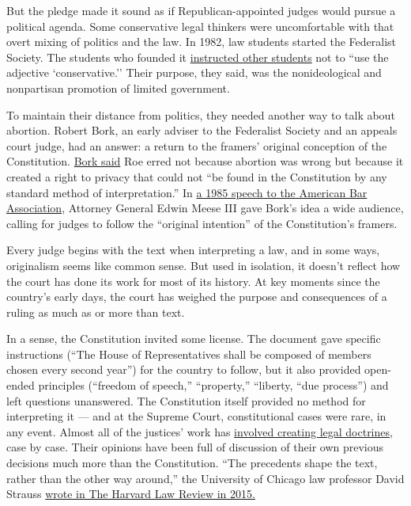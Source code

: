 But the pledge made it sound as if Republican-appointed judges would
pursue a political agenda. Some conservative legal thinkers were
uncomfortable with that overt mixing of politics and the law. In 1982,
law students started the Federalist Society. The students who founded it
\href{https://www.lawliberty.org/liberty-forum/is-legal-conservatism-as-accomplished-as-it-thinks-it-is/}{instructed
other students} not to ``use the adjective `conservative.'' Their
purpose, they said, was the nonideological and nonpartisan promotion of
limited government.

To maintain their distance from politics, they needed another way to
talk about abortion. Robert Bork, an early adviser to the Federalist
Society and an appeals court judge, had an answer: a return to the
framers' original conception of the Constitution.
\href{https://www.nytimes3xbfgragh.onion/1987/09/13/us/robert-bork-s-views-on-a-wide-range-of-legal-issues-in-his-own-words.html}{Bork
said} Roe erred not because abortion was wrong but because it created a
right to privacy that could not ``be found in the Constitution by any
standard method of interpretation.'' In
\href{https://www.nytimes3xbfgragh.onion/1985/07/10/us/meese-in-bar-groug-speech-criticizes-high-court.html}{a
1985 speech to the American Bar Association}, Attorney General Edwin
Meese III gave Bork's idea a wide audience, calling for judges to follow
the ``original intention'' of the Constitution's framers.

Every judge begins with the text when interpreting a law, and in some
ways, originalism seems like common sense. But used in isolation, it
doesn't reflect how the court has done its work for most of its history.
At key moments since the country's early days, the court has weighed the
purpose and consequences of a ruling as much as or more than text.

In a sense, the Constitution invited some license. The document gave
specific instructions (``The House of Representatives shall be composed
of members chosen every second year'') for the country to follow, but it
also provided open-ended principles (``freedom of speech,''
``property,'' ``liberty, ``due process'') and left questions unanswered.
The Constitution itself provided no method for interpreting it --- and
at the Supreme Court, constitutional cases were rare, in any event.
Almost all of the justices' work has
\href{https://chicagounbound.uchicago.edu/cgi/viewcontent.cgi?article=2999\&context=journal_articles}{involved
creating legal doctrines}, case by case. Their opinions have been full
of discussion of their own previous decisions much more than the
Constitution. ``The precedents shape the text, rather than the other way
around,'' the University of Chicago law professor David Strauss
\href{https://harvardlawreview.org/2015/11/does-the-constitution-mean-what-it-says/}{wrote
in The Harvard Law Review in 2015.}


